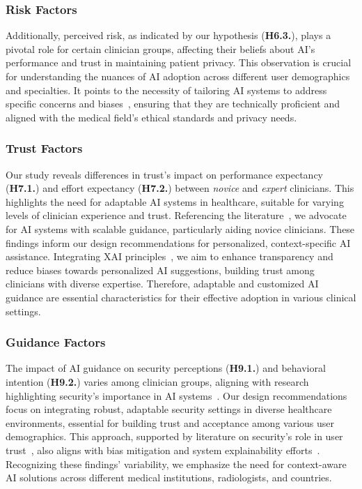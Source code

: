 \subsubsection{Risk Factors}
\label{sec:chap004006001005}

\textcolor{revised}{Additionally, perceived risk, as indicated by our hypothesis ({\bf H6.3.}), plays a pivotal role for certain clinician groups, affecting their beliefs about \ac{AI}'s performance and trust in maintaining patient privacy.
This observation is crucial for understanding the nuances of \ac{AI} adoption across different user demographics and specialties.
It points to the necessity of tailoring \ac{AI} systems to address specific concerns and biases~\cite{Topol2019, 10.1145/3290605.3300831}, ensuring that they are technically proficient and aligned with the medical field's ethical standards and privacy needs.}

\subsubsection{Trust Factors}
\label{sec:chap004006001006}

\textcolor{revised}{Our study reveals differences in trust's impact on performance expectancy ({\bf H7.1.}) and effort expectancy ({\bf H7.2.}) between {\it novice} and {\it expert} clinicians.
This highlights the need for adaptable \ac{AI} systems in healthcare, suitable for varying levels of clinician experience and trust.
Referencing the literature~\cite{gunning2017explainable, 10.1145/3411764.3445717}, we advocate for \ac{AI} systems with scalable guidance, particularly aiding novice clinicians.
These findings inform our design recommendations for personalized, context-specific \ac{AI} assistance.
Integrating \ac{XAI} principles~\cite{10.1145/2939672.2939778}, we aim to enhance transparency and reduce biases towards personalized \ac{AI} suggestions, building trust among clinicians with diverse expertise.
Therefore, adaptable and customized \ac{AI} guidance are essential characteristics for their effective adoption in various clinical settings.}

\subsubsection{Guidance Factors}
\label{sec:chap004006001007}

\textcolor{revised}{The impact of \ac{AI} guidance on security perceptions ({\bf H9.1.}) and behavioral intention ({\bf H9.2.}) varies among clinician groups, aligning with research highlighting security's importance in \ac{AI} systems~\cite{MALAMATENIOU20211192}.
Our design recommendations focus on integrating robust, adaptable security settings in diverse healthcare environments, essential for building trust and acceptance among various user demographics.
This approach, supported by literature on security's role in user trust~\cite{Amann2020}, also aligns with bias mitigation and system explainability efforts~\cite{SHIN2021102551}.
Recognizing these findings' variability, we emphasize the need for context-aware \ac{AI} solutions across different medical institutions, radiologists, and countries.}

